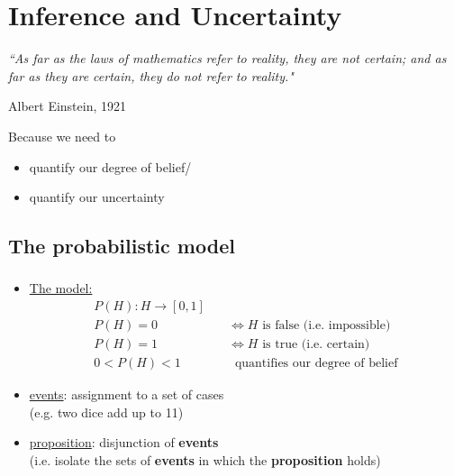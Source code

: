 \section{Inference and Uncertainty}

\begin{frame} 

\begin{center} \footnotesize
\textit{``As far as the laws of mathematics refer to reality, they are not certain; and as far as they are certain, they do not refer to reality."}
\end{center} 
\begin{flushright} \footnotesize
Albert Einstein, 1921
\end{flushright}

Because we need to
    \begin{itemize}
    \item[] quantify our degree of belief/\\
	\item[] quantify our uncertainty
    \end{itemize}
    
\end{frame}

\subsection{The probabilistic model}

\begin{frame}\frametitle{\subsecname}

\begin{itemize}
    \item \underline{The model:}\\
        \begin{align}
            P(H): H \rightarrow [0,1]&\\
            P(H) = 0 & \quad\iff H \text{ is false (i.e. impossible)} \\
            P(H) = 1 & \quad\iff H \text{ is true (i.e. certain)} \\
            0 < P(H) < 1 & \quad\;\;\text{quantifies our degree of belief}
        \end{align}
    \pause
    \item \underline{events}: assignment to a set of cases\\
    (e.g. two dice add up to 11)
    \pause
    \item \underline{proposition}: disjunction of \textbf{events}\\
    (i.e. isolate the sets of \textbf{events} in which the \textbf{proposition} holds)\\
    
\end{itemize}
    
\end{frame}

